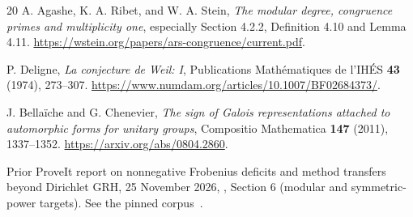\begin{thebibliography}{20}
A. Agashe, K. A. Ribet, and W. A. Stein,
\emph{The modular degree, congruence primes and multiplicity one},
especially Section 4.2.2, Definition 4.10 and Lemma 4.11.
\url{https://wstein.org/papers/ars-congruence/current.pdf}.

P. Deligne, \emph{La conjecture de Weil: I},
Publications Math\'ematiques de l'IH\'ES \textbf{43} (1974), 273--307.
\url{https://www.numdam.org/articles/10.1007/BF02684373/}.

J. Bella\"iche and G. Chenevier,
\emph{The sign of Galois representations attached to automorphic forms for
unitary groups}, Compositio Mathematica \textbf{147} (2011), 1337--1352.
\url{https://arxiv.org/abs/0804.2860}.

Prior ProveIt report on nonnegative Frobenius deficits and method transfers
beyond Dirichlet GRH, 25 November 2026,
, Section 6 (modular and
symmetric-power targets). See the pinned corpus~\cite{prior}.
\end{thebibliography}
